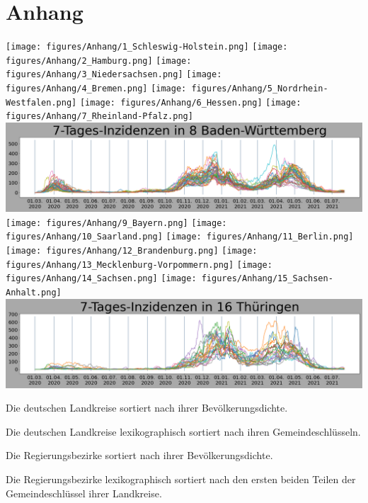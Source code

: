 \chapter{Anhang}\label{Anhang}
\texttt{[image: figures/Anhang/1\_Schleswig-Holstein.png]}
\texttt{[image: figures/Anhang/2\_Hamburg.png]}
\texttt{[image: figures/Anhang/3\_Niedersachsen.png]}
\texttt{[image: figures/Anhang/4\_Bremen.png]}
\texttt{[image: figures/Anhang/5\_Nordrhein-Westfalen.png]}
\texttt{[image: figures/Anhang/6\_Hessen.png]}
\texttt{[image: figures/Anhang/7\_Rheinland-Pfalz.png]}
\includegraphics[width=\textwidth]{figures/Anhang/8_Baden-Württemberg.png}
\texttt{[image: figures/Anhang/9\_Bayern.png]}
\texttt{[image: figures/Anhang/10\_Saarland.png]}
\texttt{[image: figures/Anhang/11\_Berlin.png]}
\texttt{[image: figures/Anhang/12\_Brandenburg.png]}
\texttt{[image: figures/Anhang/13\_Mecklenburg-Vorpommern.png]}
\texttt{[image: figures/Anhang/14\_Sachsen.png]}
\texttt{[image: figures/Anhang/15\_Sachsen-Anhalt.png]}
\includegraphics[width=\textwidth]{figures/Anhang/16_Thüringen.png}
\newpage
\begin{table}[H]
    \centering
    
    \caption{Die deutschen Landkreise sortiert nach ihrer Bevölkerungsdichte.}
    \label{tab:counties_by_pop_density}
\end{table}
\newpage
\begin{table}[H]
    \centering
    \caption{Die deutschen Landkreise lexikographisch sortiert nach ihren Gemeindeschlüsseln.}
    
    \label{tab:counties_by_admunitid}
\end{table}
\newpage
\begin{table}[H]
    \centering
    
    \caption{Die Regierungsbezirke sortiert nach ihrer Bevölkerungsdichte.}
    \label{tab:districts_by_pop_density}
\end{table}
\newpage
\begin{table}[H]
    \centering
    
    \caption{Die Regierungsbezirke lexikographisch sortiert nach den ersten beiden Teilen der Gemeindeschlüssel ihrer Landkreise.}
    \label{tab:districts_by_admunitid}
\end{table}
\newpage

